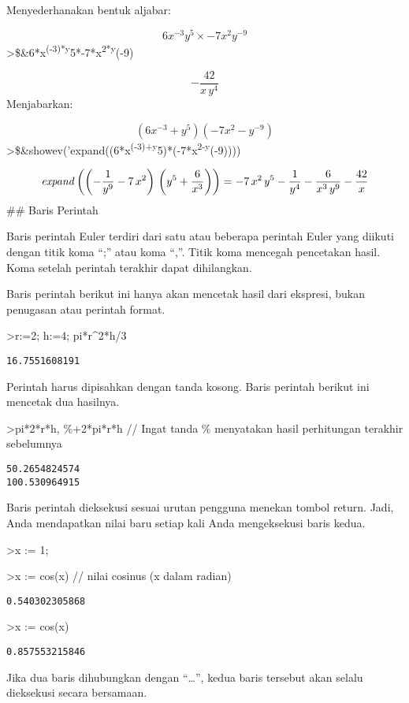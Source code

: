 \documentclass[
]{book}
\begin{document}
Menyederhanakan bentuk aljabar:

\[6x^{-3}y^5\times -7x^2y^{-9}\]\textgreater\$\&6*x\textsuperscript{(-3)*y}5*-7*x\textsuperscript{2*y}(-9)

\[-\frac{42}{x\,y^4}\]Menjabarkan:

\[(6x^{-3}+y^5)(-7x^2-y^{-9})\]\textgreater\$\&showev('expand((6*x\textsuperscript{(-3)+y}5)*(-7*x\textsuperscript{2-y}(-9))))

\[{\it expand}\left(\left(-\frac{1}{y^9}-7\,x^2\right)\,\left(y^5+
 \frac{6}{x^3}\right)\right)=-7\,x^2\,y^5-\frac{1}{y^4}-\frac{6}{x^3
 \,y^9}-\frac{42}{x}\]\#\# Baris Perintah

Baris perintah Euler terdiri dari satu atau beberapa perintah Euler yang diikuti dengan titik koma ``;'' atau koma ``,''. Titik koma mencegah pencetakan hasil. Koma setelah perintah terakhir dapat dihilangkan.

Baris perintah berikut ini hanya akan mencetak hasil dari ekspresi, bukan penugasan atau perintah format.

\textgreater r:=2; h:=4; pi*r\^{}2*h/3

\begin{verbatim}
16.7551608191
\end{verbatim}

Perintah harus dipisahkan dengan tanda kosong. Baris perintah berikut ini mencetak dua hasilnya.

\textgreater pi*2*r*h, \%+2*pi*r*h // Ingat tanda \% menyatakan hasil perhitungan terakhir sebelumnya

\begin{verbatim}
50.2654824574
100.530964915
\end{verbatim}

Baris perintah dieksekusi sesuai urutan pengguna menekan tombol return. Jadi, Anda mendapatkan nilai baru setiap kali Anda mengeksekusi baris kedua.

\textgreater x := 1;

\textgreater x := cos(x) // nilai cosinus (x dalam radian)

\begin{verbatim}
0.540302305868
\end{verbatim}

\textgreater x := cos(x)

\begin{verbatim}
0.857553215846
\end{verbatim}

Jika dua baris dihubungkan dengan ``\ldots{}'', kedua baris tersebut akan selalu dieksekusi secara bersamaan.
\end{document}
